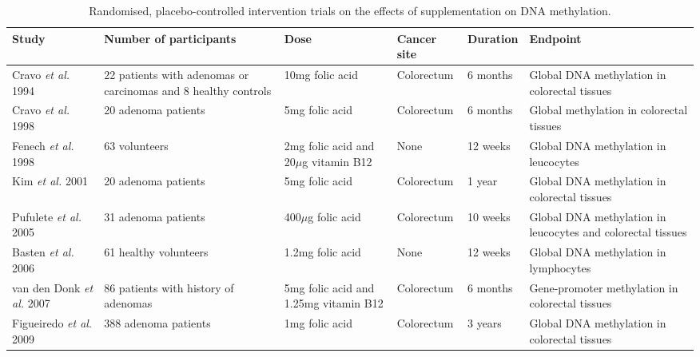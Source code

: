 \begin{sidewaystable}[h]
\caption{Randomised, placebo-controlled intervention trials on the effects of supplementation on DNA methylation.} 
\label{table2_1} 
  \begin{adjustbox}{width=20cm}
  \renewcommand{\arraystretch}{2.0}
  \begin{tabular}{L{4.0cm}L{4.0cm}L{3.0cm}L{2.9cm}L{2.3cm}L{7.0cm}}
  \hline 
  \bfseries Study & \bfseries Number of participants & \bfseries Dose & \bfseries Cancer site & \bfseries Duration & \bfseries Endpoint\\
  \hline 
  Cravo \textit{et al.} 1994 \cite{c253} &  22 patients with adenomas or carcinomas and 8 healthy controls &  10mg folic acid & Colorectum & 6 months &  Global DNA methylation in colorectal tissues\\
  Cravo \textit{et al.} 1998 \cite{c254} &  20 adenoma patients &  5mg folic acid &  Colorectum &  6 months &  Global methylation in colorectal tissues\\
  Fenech \textit{et al.} 1998 \cite{c252} &  63 volunteers &  2mg folic acid and 20\textrm{${\mu}$}g vitamin B12 &  None &  12 weeks &  Global DNA methylation in leucocytes\\
  Kim \textit{et al.} 2001 \cite{c255} &  20 adenoma patients &  5mg folic acid &  Colorectum &  1 year &  Global DNA methylation in colorectal tissues\\
  Pufulete \textit{et al.} 2005 \cite{c256} &  31 adenoma patients &  400\textrm{${\mu}$}g folic acid &  Colorectum &  10 weeks &  Global DNA methylation in leucocytes and colorectal tissues \\
  Basten \textit{et al.} 2006 \cite{c251} &  61 healthy volunteers &  1.2mg folic acid &  None &  12 weeks &  Global DNA methylation in lymphocytes\\
  van den Donk \textit{et al.} 2007 \cite{c258} &  86 patients with history of adenomas &  5mg folic acid and 1.25mg vitamin B12 &  Colorectum &  6 months &  Gene-promoter methylation in colorectal tissues \\
  Figueiredo \textit{et al}. 2009 \cite{c257} &  388 adenoma patients &  1mg folic acid &  Colorectum &  3 years &  Global DNA methylation in colorectal tissues\\
  \hline
  \end{tabular}
  \end{adjustbox}
\end{sidewaystable}

